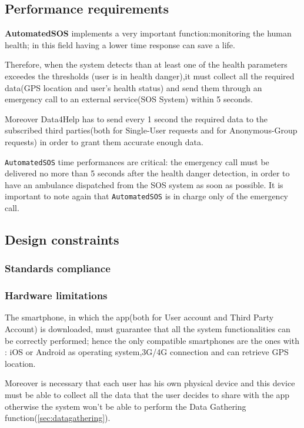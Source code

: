   \subsection{Performance requirements}
  \label{sec:performance}

    \textbf{AutomatedSOS} implements a very important function:monitoring the human health; in this field having a lower time response can save a life.

    Therefore, when the system detects than at least one of the health parameters exceedes the thresholds (user is in health danger),it must collect all the required data(GPS location and user's health status) and send them through an emergency call to an external service(SOS System) within 5 seconds.

    Moreover Data4Help has to send every 1 second the required data to the subscribed third parties(both for Single-User requests and for Anonymous-Group requests) in order to grant them accurate enough data.

    \texttt{AutomatedSOS} time performances are critical: the emergency call must be delivered no more than 5 seconds after the health danger detection, in order to have an ambulance dispatched from the SOS system as soon as possible. It is important to note again that \texttt{AutomatedSOS} is in charge only of the emergency call.

  \subsection{Design constraints}
    \subsubsection{Standards compliance}

    \subsubsection{Hardware limitations}
The smartphone, in which the app(both for User account and Third Party Account) is downloaded, must guarantee that all the system functionalities can be correctly performed; hence the only compatible smartphones are the ones with : iOS or Android as operating system,3G/4G connection and can retrieve GPS location.

 Moreover is necessary that each user has his own physical device and this device must be able to collect all the data that the user decides to share with the app otherwise the system won't be able to perform the Data Gathering function(\ref{sec:datagathering}).

